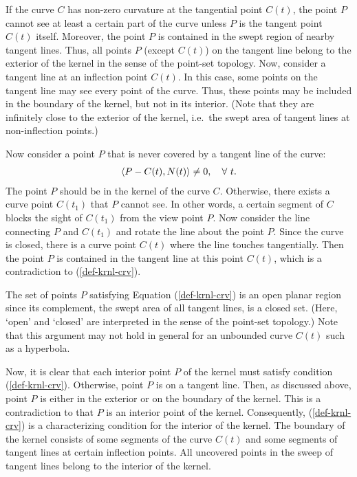 \documentclass{acmsiggraph}
\begin{document}
If the curve $C$ has non-zero curvature at the tangential point $C(t)$,
the point $P$ cannot see at least a certain part of the curve
unless $P$ is the tangent point $C(t)$ itself.
%
%
%
Moreover, the point $P$ is contained in the swept region of nearby tangent lines.
Thus, all points $P$ (except $C(t)$) on the tangent line belong to
the exterior of the kernel in the sense of the point-set topology.
Now, consider a tangent line at an inflection point $C(t)$.
In this case, some points on the tangent line may see
every point of the curve.  Thus, these points may be included
in the boundary of the kernel, but not in its interior.
(Note that they are infinitely close to the exterior of the kernel,
i.e.~the swept area of tangent lines at non-inflection points.)

Now consider a point $P$ that is never covered by a tangent line
of the curve:
\begin{eqnarray}
\left<{P - C(t)}, {N(t)} \right> \neq 0,\quad \forall\ t.
\label{def-krnl-crv}
\end{eqnarray}
The point $P$ should be in the kernel of the curve $C$.
Otherwise, there exists a curve point $C(t_1)$ that $P$ cannot see.
In other words, a certain segment of $C$ blocks the sight of $C(t_1)$
from the view point $P$.  Now consider the line connecting $P$ and
$C(t_1)$ and rotate the line about the point $P$.  Since the curve
is closed, there is a curve point $C(t)$ where the line touches
tangentially.  Then the point $P$ is contained in the tangent line
at this point $C(t)$, which is a contradiction to (\ref{def-krnl-crv}).

The set of points $P$ satisfying Equation (\ref{def-krnl-crv}) is
an open planar region since its complement, the swept area of
all tangent lines, is a closed set.  (Here, `open' and `closed'
are interpreted in the sense of the point-set topology.)
Note that this argument may not hold in general
for an unbounded curve $C(t)$ such as a hyperbola.

Now, it is clear that each interior point $P$ of the kernel 
must satisfy condition (\ref{def-krnl-crv}).
Otherwise, point $P$ is on a tangent line.
%
%
%
Then, as discussed above, point $P$ is either in the exterior
or on the boundary of the kernel.
This is a contradiction to that $P$ is an interior point of the kernel.
Consequently, (\ref{def-krnl-crv}) is a characterizing condition
for the interior of the kernel.  The boundary of the kernel
consists of some segments of the curve $C(t)$ and some segments
of tangent lines at certain inflection points.  All uncovered points
in the sweep of tangent lines belong to the interior of the kernel.
 
\end{document}
